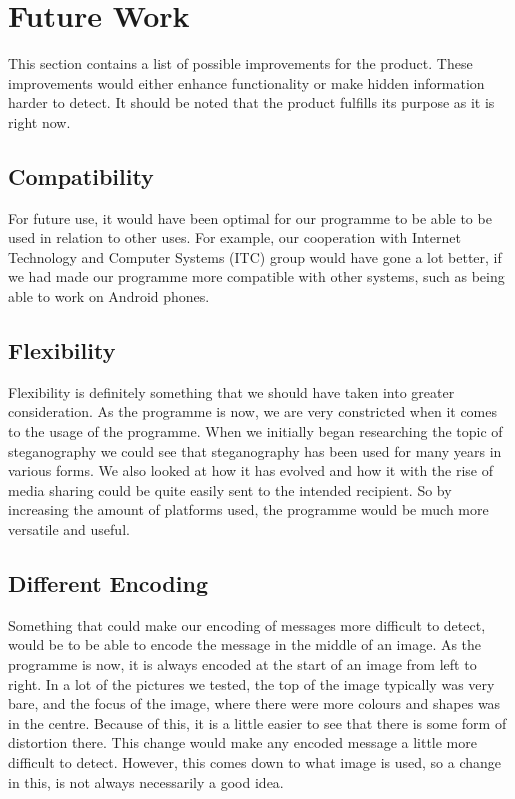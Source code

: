 \section{Future Work}
This section contains a list of possible improvements for the product.
These improvements would either enhance functionality or make hidden information harder to detect.
It should be noted that the product fulfills its purpose as it is right now.

\subsection{Compatibility}
For future use, it would have been optimal for our programme to be able to be used in relation to other uses.
For example, our cooperation with Internet Technology and Computer Systems (ITC) group would have gone a lot better, if we had made our programme more compatible with other systems, such as being able to work on Android phones.

\subsection{Flexibility}
Flexibility is definitely something that we should have taken into greater consideration.
As the programme is now, we are very constricted when it comes to the usage of the programme.
When we initially began researching the topic of steganography we could see that steganography has been used for many years in various forms.
We also looked at how it has evolved and how it with the rise of media sharing could be quite easily sent to the intended recipient.
So by increasing the amount of platforms used, the programme would be much more versatile and useful.

\subsection{Different Encoding}
Something that could make our encoding of messages more difficult to detect, would be to be able to encode the message in the middle of an image.
As the programme is now, it is always encoded at the start of an image from left to right.
In a lot of the pictures we tested, the top of the image typically was very bare, and the focus of the image, where there were more colours and shapes was in the centre.
Because of this, it is a little easier to see that there is some form of distortion there.
This change would make any encoded message a little more difficult to detect.
However, this comes down to what image is used, so a change in this, is not always necessarily a good idea.

